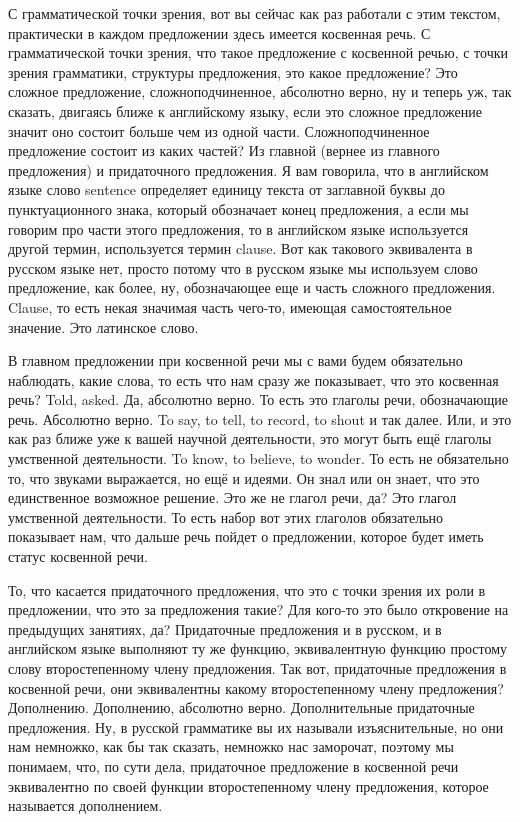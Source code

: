 \documentclass[main.tex]{subfiles}
\begin{document}
С грамматической точки зрения, вот вы сейчас как раз работали с этим текстом, практически в каждом предложении здесь имеется косвенная речь.
С грамматической точки зрения, что такое предложение с косвенной речью, с точки зрения грамматики, структуры предложения, это какое предложение?
Это сложное предложение, сложноподчиненное, абсолютно верно, ну и теперь уж, так сказать, двигаясь ближе к английскому языку, если это сложное предложение значит оно состоит больше чем из одной части.
Сложноподчиненное предложение состоит из каких частей?
Из главной (вернее из главного предложения) и придаточного предложения.
Я вам говорила, что в английском языке слово sentence определяет единицу текста от заглавной буквы до пунктуационного знака, который обозначает конец предложения, а если мы говорим про части этого предложения, то в английском языке используется другой термин, используется термин clause.
Вот как такового эквивалента в русском языке нет, просто потому что в русском языке мы используем слово предложение, как более, ну, обозначающее еще и часть сложного предложения.
Clause, то есть некая значимая часть чего-то, имеющая самостоятельное значение.
Это латинское слово.

В главном предложении при косвенной речи мы с вами будем обязательно наблюдать, какие слова, то есть что нам сразу же показывает, что это косвенная речь?
Told, asked.
Да, абсолютно верно.
То есть это глаголы речи, обозначающие речь.
Абсолютно верно.
To say, to tell, to record, to shout и так далее.
Или, и это как раз ближе уже к вашей научной деятельности, это могут быть ещё глаголы умственной деятельности.
To know, to believe, to wonder.
То есть не обязательно то, что звуками выражается, но ещё и идеями.
Он знал или он знает, что это единственное возможное решение.
Это же не глагол речи, да?
Это глагол умственной деятельности.
То есть набор вот этих глаголов обязательно показывает нам, что дальше речь пойдет о предложении, которое будет иметь статус косвенной речи.

То, что касается придаточного предложения, что это с точки зрения их роли в предложении, что это за предложения такие?
Для кого-то это было откровение на предыдущих занятиях, да?
Придаточные предложения и в русском, и в английском языке выполняют ту же функцию, эквивалентную функцию простому слову второстепенному члену предложения.
Так вот, придаточные предложения в косвенной речи, они эквивалентны какому второстепенному члену предложения?
Дополнению.
Дополнению, абсолютно верно.
Дополнительные придаточные предложения.
Ну, в русской грамматике вы их называли изъяснительные, но они нам немножко, как бы так сказать, немножко нас заморочат, поэтому мы понимаем, что, по сути дела, придаточное предложение в косвенной речи эквивалентно по своей функции второстепенному члену предложения, которое называется дополнением.
\end{document}
